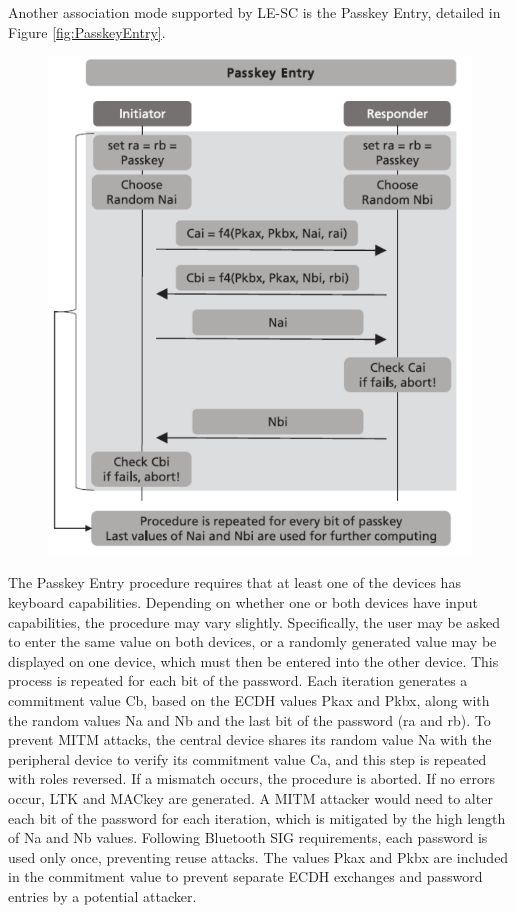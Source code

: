 \documentclass{Configuration_Files/PoliMi3i_thesis}
\begin{document}
Another association mode supported by LE-SC is the Passkey Entry, detailed in Figure \ref{fig:PasskeyEntry}.

\begin{figure}[H]
    \centering
    \includegraphics[scale=0.7]{Bluetooth_Security/7.png}
    \label{fig:pairing_procedure}
\end{figure}

The Passkey Entry procedure requires that at least one of the devices has keyboard capabilities. Depending on whether one or both devices have input capabilities, the procedure may vary slightly. Specifically, the user may be asked to enter the same value on both devices, or a randomly generated value may be displayed on one device, which must then be entered into the other device. This process is repeated for each bit of the password. Each iteration generates a commitment value Cb, based on the ECDH values Pkax and Pkbx, along with the random values Na and Nb and the last bit of the password (ra and rb). To prevent MITM attacks, the central device shares its random value Na with the peripheral device to verify its commitment value Ca, and this step is repeated with roles reversed. If a mismatch occurs, the procedure is aborted. If no errors occur, LTK and MACkey are generated. A MITM attacker would need to alter each bit of the password for each iteration, which is mitigated by the high length of Na and Nb values. Following Bluetooth SIG requirements, each password is used only once, preventing reuse attacks. The values Pkax and Pkbx are included in the commitment value to prevent separate ECDH exchanges and password entries by a potential attacker.
\end{document}

